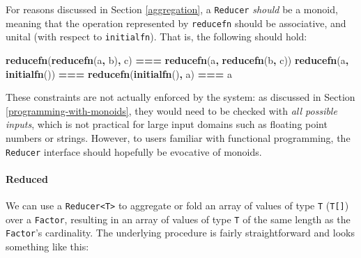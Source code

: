\documentclass[
  openany]{book}
\newenvironment{Shaded}{\begin{snugshade}}{\end{snugshade}}
\newcommand{\FunctionTok}[1]{\textcolor[rgb]{0.13,0.29,0.53}{\textbf{#1}}}
\newcommand{\NormalTok}[1]{#1}
\newcommand{\OperatorTok}[1]{\textcolor[rgb]{0.81,0.36,0.00}{\textbf{#1}}}
\theoremstyle{definition}
\theoremstyle{definition}
\theoremstyle{definition}
\theoremstyle{definition}
\theoremstyle{remark}
\begin{document}
For reasons discussed in Section \ref{aggregation}, a \texttt{Reducer} \emph{should} be a monoid, meaning that the operation represented by \texttt{reducefn} should be associative, and unital (with respect to \texttt{initialfn}). That is, the following should hold:

\begin{Shaded}
\begin{Highlighting}[]
\FunctionTok{reducefn}\NormalTok{(}\FunctionTok{reducefn}\NormalTok{(a}\OperatorTok{,}\NormalTok{ b)}\OperatorTok{,}\NormalTok{ c) }\OperatorTok{===} \FunctionTok{reducefn}\NormalTok{(a}\OperatorTok{,} \FunctionTok{reducefn}\NormalTok{(b}\OperatorTok{,}\NormalTok{ c))}
\FunctionTok{reducefn}\NormalTok{(a}\OperatorTok{,} \FunctionTok{initialfn}\NormalTok{()) }\OperatorTok{===} \FunctionTok{reducefn}\NormalTok{(}\FunctionTok{initialfn}\NormalTok{()}\OperatorTok{,}\NormalTok{ a) }\OperatorTok{===}\NormalTok{ a}
\end{Highlighting}
\end{Shaded}

These constraints are not actually enforced by the system: as discussed in Section \ref{programming-with-monoids}, they would need to be checked with \emph{all possible inputs}, which is not practical for large input domains such as floating point numbers or strings. However, to users familiar with functional programming, the \texttt{Reducer} interface should hopefully be evocative of monoids.

\paragraph{Reduced}\label{reduced}

We can use a \texttt{Reducer\textless{}T\textgreater{}} to aggregate or fold an array of values of type \texttt{T} (\texttt{T{[}{]}}) over a \texttt{Factor}, resulting in an array of values of type \texttt{T} of the same length as the \texttt{Factor}'s cardinality. The underlying procedure is fairly straightforward and looks something like this:
\end{document}
